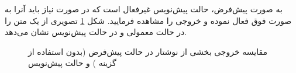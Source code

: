 به صورت پیش‌فرض، حالت پیش‌نویس غیرفعال است که در صورت نیاز باید آنرا به صورت فوق فعال نموده و خروجی را مشاهده فرمایید.  شکل 
\ref{fig:draft}
تصویری از یک متن را در حالت معمولی و در حالت پیش‌نویس نشان می‌دهد.
\begin{figure}[t]
\centering 
{}
\caption[مقایسه حالت معمولی و حالت پیش‌نویس]
{مقایسه خروجی بخشی از نوشتار در حالت پیش‌فرض (بدون استفاده از گزینه 
) و حالت پیش‌نویس
}
\label{fig:draft} %
\end{figure}


